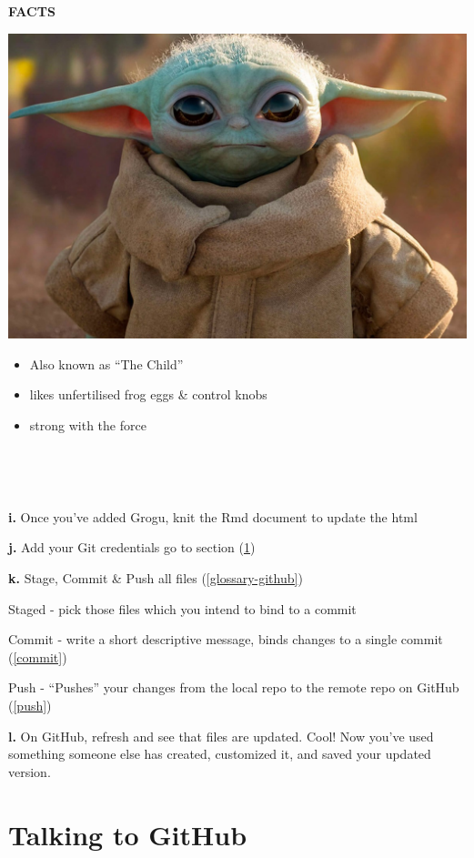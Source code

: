 \documentclass[
]{book}
\begin{document}
\textbf{FACTS}

\includegraphics[width=16.25in]{images/Grogu}

\begin{itemize}
\item
  Also known as ``The Child''
\item
  likes unfertilised frog eggs \& control knobs
\item
  strong with the force
\end{itemize}

~

~

\textbf{i.} Once you've added Grogu, knit the Rmd document to update the html

\textbf{j.} Add your Git credentials go to section (\ref{talking-to-github})

\textbf{k.} Stage, Commit \& Push all files (\ref{glossary-github})

Staged - pick those files which you intend to bind to a commit

Commit - write a short descriptive message, binds changes to a single commit (\ref{commit})

Push - ``Pushes'' your changes from the local repo to the remote repo on GitHub (\ref{push})

\textbf{l.} On GitHub, refresh and see that files are updated. Cool! Now you've used something someone else has created, customized it, and saved your updated version.

\hypertarget{talking-to-github}{%
\section{Talking to GitHub}\label{talking-to-github}}
\end{document}
